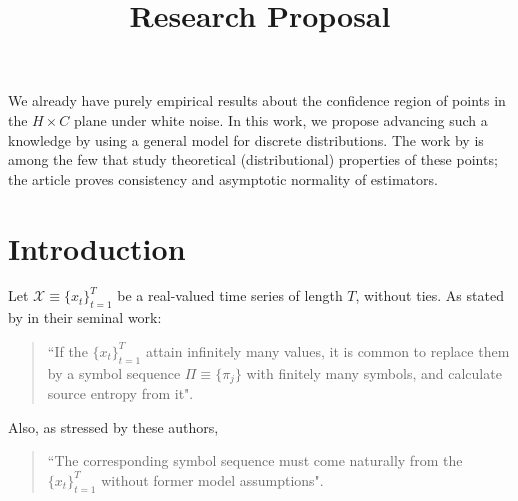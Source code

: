 \documentclass[12pt]{article}
\title{Research Proposal}
\begin{document}
\maketitle
	
We already have purely empirical results about the confidence region of points in the $H\times C$ plane under white noise.
In this work, we propose advancing such a knowledge by using a general model for discrete distributions.
The work by \citet{OrdinalPatternProbabilities} is among the few that study theoretical (distributional) properties of these points; the article proves consistency and asymptotic normality of estimators.

\section{Introduction}

Let ${\mathcal X} \equiv \{x_t\}_{t=1}^{T}$ be a real-valued time series of length $T$, without ties. 
As stated by \citet{PermutationEntropyBandtPompe} in their seminal work:  
\begin{quote}
	``If the $\{x_t\}_{t=1}^{T}$ attain infinitely many values, it is common to replace them by a symbol sequence 
	$\Pi \equiv \{\pi_j\}$ with finitely many symbols, and calculate source entropy from it".
\end{quote}
Also, as stressed by these authors, 
\begin{quote}
	``The corresponding symbol sequence must come 
	naturally from the $\{x_t\}_{t=1}^{T}$ without former model assumptions".
\end{quote}
\end{document}
